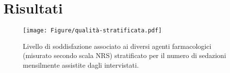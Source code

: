 \chapter{Risultati}

\begin{figure}[h]
    \centering
    \texttt{[image: Figure/qualità-stratificata.pdf]}
    \caption{Livello di soddisfazione associato ai diversi agenti farmacologici (misurato secondo scala NRS) stratificato per il numero di sedazioni mensilmente assistite dagli intervistati.}
    \label{fig:qualitastratificata}
\end{figure}
